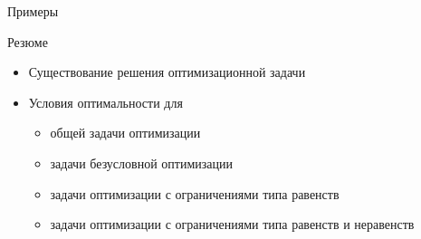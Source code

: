 \documentclass[12pt]{beamer}
\begin{document}
\begin{frame}{Примеры}
\begin{itemize}
\end{itemize}
\end{frame}

\begin{frame}{Резюме}
\begin{itemize}
\item Существование решения оптимизационной задачи 
\item Условия оптимальности для
\begin{itemize}
\item общей задачи оптимизации
\item задачи безусловной оптимизации
\item задачи оптимизации с ограничениями типа равенств
\item задачи оптимизации с ограничениями типа равенств и неравенств
\end{itemize}
\end{itemize}
\end{frame}
\end{document}
